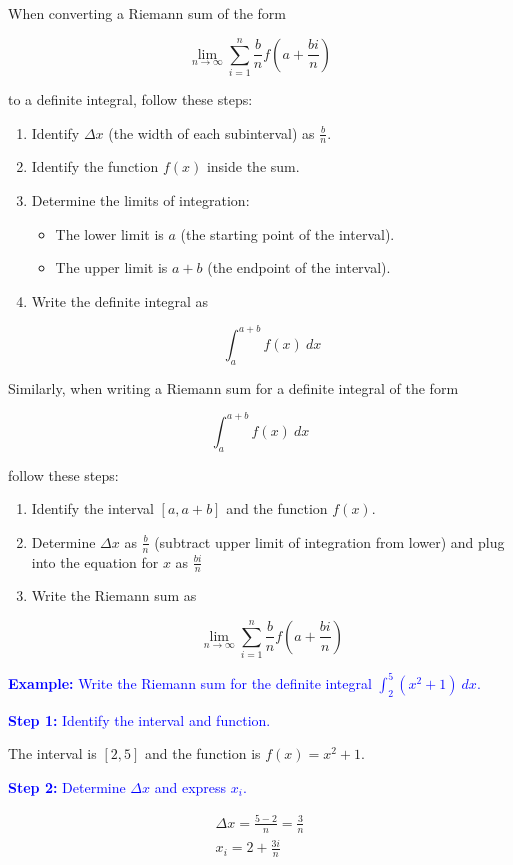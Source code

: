 \documentclass[letterpaper, 12pt]{article}
\newcommand{\example}[1]{\textcolor{blue}{\textbf{Example:} #1}}
\newcommand{\step}[2]{\textcolor{blue}{\textbf{Step #1:} #2}}
\begin{document}
When converting a Riemann sum of the form

$$\lim_{n \to \infty} \sum_{i=1}^{n} \frac{b}{n} f\left(a + \frac{bi}{n}\right)$$

to a definite integral, follow these steps:

\begin{enumerate}
\item Identify $\Delta x$ (the width of each subinterval) as $\frac{b}{n}$.
\item Identify the function $f(x)$ inside the sum.
\item Determine the limits of integration:
    \begin{itemize}
    \item The lower limit is $a$ (the starting point of the interval).
    \item The upper limit is $a + b$ (the endpoint of the interval).
    \end{itemize}
\item Write the definite integral as

$$\int_{a}^{a+b} f(x) \: dx$$
\end{enumerate}

Similarly, when writing a Riemann sum for a definite integral of the form

$$\int_{a}^{a+b} f(x) \: dx$$

follow these steps:

\begin{enumerate}
\item Identify the interval $[a, a+b]$ and the function $f(x)$.
\item Determine $\Delta x$ as $\frac{b}{n}$ (subtract upper limit of integration from lower) and plug into the equation for $x$ as $\frac{bi}{n}$
\item Write the Riemann sum as

$$\lim_{n \to \infty} \sum_{i=1}^{n} \frac{b}{n} f\left(a + \frac{bi}{n}\right)$$

\end{enumerate}

\example{Write the Riemann sum for the definite integral $\displaystyle \int_{2}^{5} (x^2 + 1) \: dx$.}

\step{1}{Identify the interval and function.}

The interval is $[2, 5]$ and the function is $f(x) = x^2 + 1$.

\step{2}{Determine $\Delta x$ and express $x_i$.}

\begin{gather*}
\Delta x = \frac{5 - 2}{n} = \frac{3}{n} \\
x_i = 2 + \frac{3i}{n}
\end{gather*}
\end{document}
